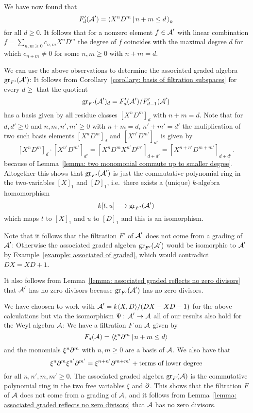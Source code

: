 \begin{fluff}
  We have now found that
  \[
      F'_d(\weyl')
    = \gen{
        X^n D^m
      \suchthat
        n + m \leq d
        \,
      }_k
  \]
  for all $d \geq 0$.
  It follows that for a nonzero element $f \in \operatorname{\mathcal{A}}'$ with linear combination $f = \sum_{n, m \geq 0} c_{n,m} X^n D^m$ the degree of $f$ coincides with the maximal degree $d$ for which $c_{n+m} \neq 0$ for some $n, m \geq 0$ with $n+m = d$.
  
  We can use the above observations to determine the associated graded algebra $\operatorname{gr}_{F'}(\operatorname{\mathcal{A}}')$:
  It follows from Corollary~\ref{corollary: basis of filtration subspaces} for every $d \geq $ that the quotient
  \[
      \operatorname{gr}_{F'}(\operatorname{\mathcal{A}}')_d
    = F'_d(\operatorname{\mathcal{A}}') / F'_{d-1}(\operatorname{\mathcal{A}}')
  \]
  has a basis given by all residue classes $[X^n D^m]_d$ with $n + m = d$.
  Note that for $d, d' \geq 0$ and $n,m,n',m' \geq 0$ with $n + m = d$, $n' + m' = d'$ the muliplication of two such basis elements $[X^n D^m]_d$ and $[X^{n'} D^{m'}]_{d'}$ is given by
  \[
      [X^n D^m]_d \cdot [X^{n'} D^{m'}]_{d'}
    = [X^n D^m X^{n'} D^{m'}]_{d + d'}
    = [X^{n + n'} D^{m + m'}]_{d + d'} \,.
  \]
  because of Lemma~\ref{lemma: two monomonial commute up to smaller degree}.
  Altogether this shows that $\operatorname{gr}_{F'}(\operatorname{\mathcal{A}}')$ is just the commutative polynomial ring in the two-variables $[X]_1$ and $[D]_1$, i.e.\ there exists a (unique) $k$-algebra homomorphism
  \[
            k[t,u]
    \longrightarrow \operatorname{gr}_{F'}(\operatorname{\mathcal{A}}')
  \]
  which maps $t$ to $[X]_1$ and $u$ to $[D]_1$ and this is an isomorphism.
  
  Note that it follows that the filtration $F'$ of $\operatorname{\mathcal{A}}'$ does not come from a grading of~$\operatorname{\mathcal{A}}'$:
  Otherwise the associated graded algebra $\operatorname{gr}_{F'}(\operatorname{\mathcal{A}}')$ would be isomorphic to $\operatorname{\mathcal{A}}'$ by Example~\ref{example: associated of graded}, which would contradict $DX = XD + 1$.
  
  It also follows from Lemma~\ref{lemma: associated graded reflects no zero divisors} that $\operatorname{\mathcal{A}}'$ has no zero divisors because $\operatorname{gr}_{F'}(\operatorname{\mathcal{A}}')$ has no zero divisors.
\end{fluff}


\begin{fluff}
  We have choosen to work with $\operatorname{\mathcal{A}}' = k\langle X,D \rangle/(DX-XD-1)$ for the above calculations but via the isomorphism $\Psi \colon \operatorname{\mathcal{A}}' \to \operatorname{\mathcal{A}}$ all of our results also hold for the Weyl algebra $\operatorname{\mathcal{A}}$:
  We have a filtration $F$ on $\operatorname{\mathcal{A}}$ given by
  \[
      F_d(\weyl)
    = \gen{ \xi^n \del^m \suchthat n + m \leq d }
  \]
  and the monomials $\xi^n \partial^m$ with $n, m \geq 0$ are a basis of $\operatorname{\mathcal{A}}$.
  We also have that
  \[
      \xi^n \partial^m \xi^{n'} \partial^{m'}
    =   \xi^{n + n'} \partial^{m + m'}
      + \text{terms of lower degree}
  \]
  for all $n, n', m, m' \geq 0$.
  The associated graded algebra $\operatorname{gr}_F(\operatorname{\mathcal{A}})$ is the commutative polynomial ring in the two free variables $\xi$ and $\partial$.
  This shows that the filtration $F$ of $\operatorname{\mathcal{A}}$ does not come from a grading of $\operatorname{\mathcal{A}}$, and it follows from Lemma~\ref{lemma: associated graded reflects no zero divisors} that $\operatorname{\mathcal{A}}$ has no zero divisors.
\end{fluff}


